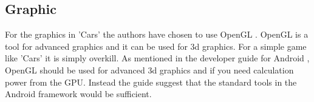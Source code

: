 \subsection{Graphic}
For the graphics in 'Cars' the authors have chosen to use OpenGL \cite{opengl}.
OpenGL is a tool for advanced graphics and it can be used for 3d graphics.
For a simple game like 'Cars' it is simply overkill.
As mentioned in the developer guide for Android \cite{android_opengl}, OpenGL should be used for advanced 3d graphics and if you need calculation power from the GPU.
Instead the guide suggest that the standard tools in the Android framework would be sufficient.